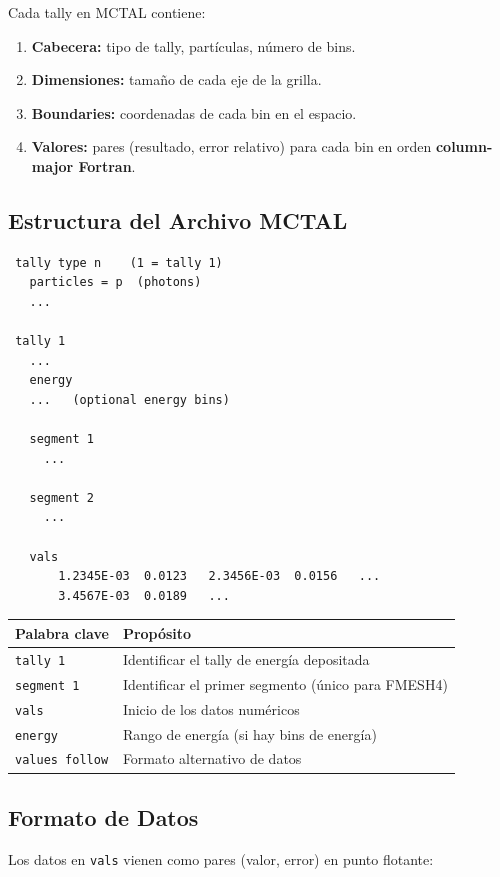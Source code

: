 \documentclass[12pt,a4paper]{article}
\begin{document}
Cada tally en MCTAL contiene:
\begin{enumerate}
  \item \textbf{Cabecera:} tipo de tally, partículas, número de bins.
  \item \textbf{Dimensiones:} tamaño de cada eje de la grilla.
  \item \textbf{Boundaries:} coordenadas de cada bin en el espacio.
  \item \textbf{Valores:} pares (resultado, error relativo) para cada bin en orden \textbf{column-major Fortran}.
\end{enumerate}

\subsection{Estructura del Archivo MCTAL}

\begin{lstlisting}
 tally type n    (1 = tally 1)
   particles = p  (photons)
   ...

 tally 1
   ...
   energy
   ...   (optional energy bins)

   segment 1
     ...

   segment 2
     ...

   vals
       1.2345E-03  0.0123   2.3456E-03  0.0156   ...
       3.4567E-03  0.0189   ...
\end{lstlisting}

\begin{tabular}{p{4cm} p{11cm}}
\toprule
\textbf{Palabra clave} & \textbf{Propósito} \\
\midrule
\texttt{tally 1} & Identificar el tally de energía depositada \\
\texttt{segment 1} & Identificar el primer segmento (único para FMESH4) \\
\texttt{vals} & Inicio de los datos numéricos \\
\texttt{energy} & Rango de energía (si hay bins de energía) \\
\texttt{values follow} & Formato alternativo de datos \\
\bottomrule
\end{tabular}

\subsection{Formato de Datos}

Los datos en \texttt{vals} vienen como pares (valor, error) en punto flotante:
\end{document}
